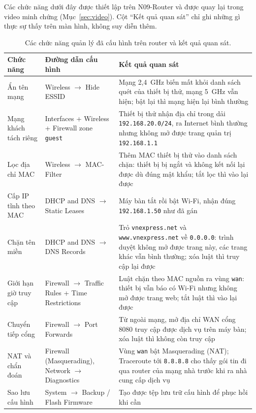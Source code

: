 Các chức năng dưới đây được thiết lập trên N09-Router và được quay lại trong
video minh chứng (Mục~\ref{sec:video}). Cột ``Kết quả quan sát'' chỉ ghi những gì
thực sự thấy trên màn hình, không suy diễn thêm.

\begin{table}[htbp]
  \centering\footnotesize
  \caption{Các chức năng quản lý đã cấu hình trên router và kết quả quan sát.}
  \label{tab:chucnang-router}
  \begin{tabularx}{\linewidth}{@{} L{0.7} L{1.1} L{1.2} @{}}
    \toprule
    \textbf{Chức năng} & \textbf{Đường dẫn cấu hình} & \textbf{Kết quả quan sát} \\
    \midrule
    Ẩn tên mạng & Wireless $\rightarrow$ Hide ESSID & Mạng 2,4~GHz biến mất khỏi
      danh sách quét của thiết bị thử, mạng 5~GHz vẫn hiện; bật lại thì mạng hiện
      lại bình thường \\
    Mạng khách tách riêng & Interfaces + Wireless + Firewall zone
      \texttt{guest} & Thiết bị thử nhận địa chỉ trong dải
      \texttt{192.168.20.0/24}, ra Internet bình thường nhưng không mở được trang
      quản trị \texttt{192.168.1.1} \\
    Lọc địa chỉ MAC & Wireless $\rightarrow$ MAC-Filter & Thêm MAC thiết bị thử
      vào danh sách chặn: thiết bị bị ngắt và không kết nối lại được dù đúng mật
      khẩu; tắt lọc thì vào lại được \\
    Cấp IP tĩnh theo MAC & DHCP and DNS $\rightarrow$ Static Leases & Máy bàn tắt
      rồi bật Wi-Fi, nhận đúng \texttt{192.168.1.50} như đã gán \\
    Chặn tên miền & DHCP and DNS $\rightarrow$ DNS Records & Trỏ
      \texttt{vnexpress.net} và \texttt{www.vnexpress.net} về \texttt{0.0.0.0}:
      trình duyệt không mở được trang này, các trang khác vẫn bình thường; xóa
      luật thì truy cập lại được \\
    Giới hạn giờ truy cập & Firewall $\rightarrow$ Traffic Rules + Time
      Restrictions & Luật chặn theo MAC nguồn ra vùng \texttt{wan}: thiết bị vẫn
      báo có Wi-Fi nhưng không mở được trang web; tắt luật thì vào lại được \\
    Chuyển tiếp cổng & Firewall $\rightarrow$ Port Forwards & Từ ngoài mạng, mở
      địa chỉ WAN cổng 8080 truy cập được dịch vụ trên máy bàn; xóa luật thì
      không còn truy cập \\
    NAT và chẩn đoán & Firewall (Masquerading), Network $\rightarrow$
      Diagnostics & Vùng \texttt{wan} bật Masquerading (NAT); Traceroute tới
      \texttt{8.8.8.8} cho thấy gói tin đi qua router của mạng nhà trước khi ra
      nhà cung cấp dịch vụ \\
    Sao lưu cấu hình & System $\rightarrow$ Backup / Flash Firmware & Tạo được
      tệp lưu trữ cấu hình để phục hồi khi cần \\
    \bottomrule
  \end{tabularx}
\end{table}

